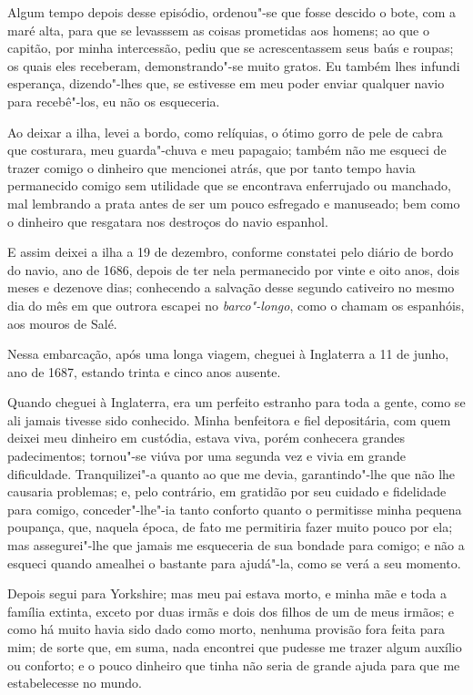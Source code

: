 Algum tempo depois desse episódio, ordenou"-se que fosse descido o bote,
com a maré alta, para que se levasssem as coisas prometidas aos homens;
ao que o capitão, por minha intercessão, pediu que se acrescentassem
seus baús e roupas; os quais eles receberam, demonstrando"-se muito
gratos. Eu também lhes infundi esperança, dizendo"-lhes que, se estivesse
em meu poder enviar qualquer navio para recebê"-los, eu não os
esqueceria.

Ao deixar a ilha, levei a bordo, como relíquias, o ótimo gorro de pele
de cabra que costurara, meu guarda"-chuva e meu papagaio; também não me
esqueci de trazer comigo o dinheiro que mencionei atrás, que por tanto
tempo havia permanecido comigo sem utilidade que se encontrava
enferrujado ou manchado, mal lembrando a prata antes de ser um pouco
esfregado e manuseado; bem como o dinheiro que resgatara nos destroços
do navio espanhol.

E assim deixei a ilha a 19 de dezembro, conforme constatei pelo diário
de bordo do navio, ano de 1686, depois de ter nela permanecido por vinte
e oito anos, dois meses e dezenove dias; conhecendo a salvação desse
segundo cativeiro no mesmo dia do mês em que outrora escapei no
\emph{barco"-longo}, como o chamam os espanhóis, aos mouros de Salé.

Nessa embarcação, após uma longa viagem, cheguei à Inglaterra a 11 de
junho, ano de 1687, estando trinta e cinco anos ausente.

Quando cheguei à Inglaterra, era um perfeito estranho para toda a gente,
como se ali jamais tivesse sido conhecido. Minha benfeitora e fiel
depositária, com quem deixei meu dinheiro em custódia, estava viva,
porém conhecera grandes padecimentos; tornou"-se viúva por uma segunda
vez e vivia em grande dificuldade. Tranquilizei"-a quanto ao que me
devia, garantindo"-lhe que não lhe causaria problemas; e, pelo contrário,
em gratidão por seu cuidado e fidelidade para comigo, conceder"-lhe"-ia
tanto conforto quanto o permitisse minha pequena poupança, que, naquela
época, de fato me permitiria fazer muito pouco por ela; mas
assegurei"-lhe que jamais me esqueceria de sua bondade para comigo; e não
a esqueci quando amealhei o bastante para ajudá"-la, como se verá a seu
momento.

Depois segui para Yorkshire; mas meu pai estava morto, e minha mãe e
toda a família extinta, exceto por duas irmãs e dois dos filhos de um de
meus irmãos; e como há muito havia sido dado como morto, nenhuma
provisão fora feita para mim; de sorte que, em suma, nada encontrei que
pudesse me trazer algum auxílio ou conforto; e o pouco dinheiro que
tinha não seria de grande ajuda para que me estabelecesse no mundo.


